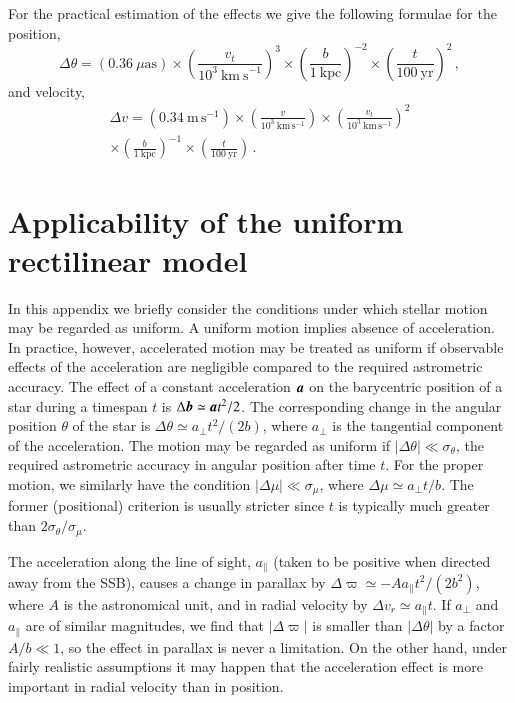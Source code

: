 \documentclass{aa}
\def\vec#1{\ensuremath{\mathchoice{\mbox{\boldmath$\displaystyle#1$}}
{\mbox{\boldmath$\textstyle#1$}}
{\mbox{\boldmath$\scriptstyle#1$}}
{\mbox{\boldmath$\scriptscriptstyle#1$}}}}
\begin{document}
For the practical estimation of the effects we give the following formulae for the position,
\begin{equation*}
    \Delta\theta=\left(0.36~\mu\mathrm{as}\right)
    \times\left(\frac{v_t}{10^3~\mathrm{km~s}^{-1}}\right)^3
    \times\left(\frac{b}{1~\mathrm{kpc}}\right)^{-2}
    \times\left(\frac{t}{100~\mathrm{yr}}\right)^2\,,
\end{equation*}
and velocity,
\begin{multline*}
    \Delta v=\left(0.34\ \mathrm{m}\,\mathrm{s}^{-1}\right)
    \times\left(\frac{v}{10^3\ \mathrm{km}\,\mathrm{s}^{-1}}\right)
    \times\left(\frac{v_t}{10^3\ \mathrm{km}\,\mathrm{s}^{-1}}\right)^2\\
    \times\left(\frac{b}{1\ \mathrm{kpc}}\right)^{-1}
    \times\left(\frac{t}{100\ \mathrm{yr}}\right)\,.
\end{multline*}



\section{Applicability of the uniform rectilinear model}
\label{ss:model_applicability}

In this appendix we briefly consider the conditions under which stellar motion may be regarded as uniform.
A uniform motion implies absence of acceleration. In practice, however, accelerated motion may be treated
as uniform if observable effects of the acceleration are negligible compared to the required astrometric
accuracy. The effect of a constant acceleration $\vec{a}$ on the barycentric position of a star during a timespan $t$ is $\Delta\vec{b}\simeq \vec{a}t^2/2$. The corresponding change in the angular position
$\theta$ of the star is $\Delta\theta\simeq a_\perp t^2/(2b)$, where $a_\perp$ is
the tangential component of the acceleration. The motion may be regarded as uniform if
$|\Delta\theta|\ll\sigma_\theta$, the required astrometric accuracy in angular position after time $t$.
For the proper motion, we similarly have the condition $|\Delta\mu|\ll\sigma_\mu$, where
$\Delta\mu\simeq a_\perp t/b$. The former (positional) criterion is usually stricter since
$t$ is typically much greater than $2\sigma_\theta/\sigma_\mu$.

The acceleration along the line of sight, $a_\parallel$ (taken to be positive when directed away from the
SSB), causes a change in parallax by $\Delta\varpi\simeq -A a_\parallel  t^2/(2b^2)$, where $A$ is the
astronomical unit, and in radial velocity by $\Delta v_r\simeq a_\parallel t$. If $a_\perp$ and $a_\parallel$
are of similar magnitudes, we find that $|\Delta\varpi|$ is smaller than $|\Delta\theta|$ by a factor
$A/b\ll 1$, so the effect in parallax is never a limitation. On the other hand, under fairly realistic
assumptions it may happen that the acceleration effect is more important in radial velocity than in
position.
\end{document}
